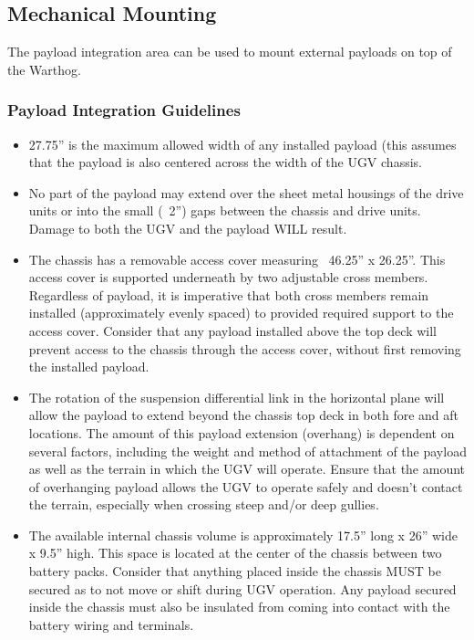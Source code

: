 \documentclass[]{clearpath-latex/clearpath-manual}
\begin{document}
\pagebreak[4]
\subsection{Mechanical Mounting}
\label{mechanical}

The payload integration area can be used to mount external payloads on top of the Warthog.


\subsubsection{Payload Integration Guidelines}

\begin{itemize}[nolistsep]

\item 27.75” is the maximum allowed width of any installed payload (this assumes that the payload is also centered across the width of the UGV chassis.

\item  No part of the payload may extend over the sheet metal housings of the drive units or into the small (~2”) gaps between the chassis and drive units. Damage to both the UGV and the payload WILL result.

\item  The chassis has a removable access cover measuring ~46.25” x 26.25”. This access cover is supported underneath by two adjustable cross members. Regardless of payload, it is imperative that both cross members remain installed (approximately evenly spaced) to provided required support to the access cover. Consider that any payload installed above the top deck will prevent access to the chassis through the access cover, without first removing the installed payload.

\item  The rotation of the suspension differential link in the horizontal plane will allow the payload to extend beyond the chassis top deck in both fore and aft locations. The amount of this payload extension (overhang) is dependent on several factors, including the weight and method of attachment of the payload as well as the terrain in which the UGV will operate. Ensure that the amount of overhanging payload allows the UGV to operate safely and doesn’t contact the terrain, especially when crossing steep and/or deep gullies.

\item  The available internal chassis volume is approximately 17.5” long x 26” wide x 9.5” high. This space is located at the center of the chassis between two battery packs. Consider that anything placed inside the chassis MUST be secured as to not move or shift during UGV operation. Any payload secured inside the chassis must also be insulated from coming into contact with the battery wiring and terminals.

\end{itemize}
\end{document}
